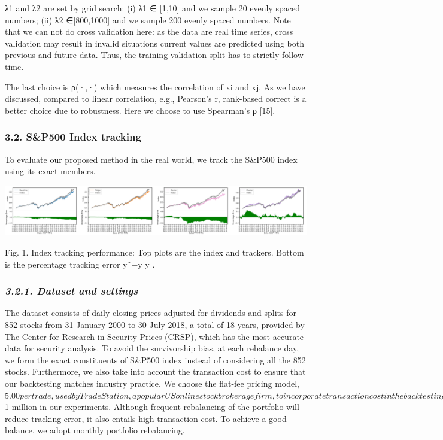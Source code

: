 \documentclass{article}
\begin{document}
λ1 and λ2 are set by grid search: (i) λ1 ∈ [1,10] and we sample 20 evenly spaced numbers; (ii) λ2 ∈[800,1000] and we sample 200 evenly spaced numbers. Note that we can not do cross validation here: as the data are real time series, cross validation may result in invalid situations current values are predicted using both previous and future data. Thus, the training-validation split has to strictly follow time.

The last choice is ρ(·,·) which measures the correlation of xi and xj. As we have discussed, compared to linear correlation, e.g., Pearson's r, rank-based correct is a better choice due to robustness. Here we choose to use Spearman's ρ [15].

\subsubsection{3.2. S\&P500 Index tracking}

To evaluate our proposed method in the real world, we track the S\&P500 index using its exact members.


\includegraphics{_page_3_Figure_0.png}


Fig. 1. Index tracking performance: Top plots are the index and trackers. Bottom is the percentage tracking error yˆ−y y .

\subsubsection{\textit{3.2.1. Dataset and settings}}

The dataset consists of daily closing prices adjusted for dividends and splits for 852 stocks from 31 January 2000 to 30 July 2018, a total of 18 years, provided by The Center for Research in Security Prices (CRSP), which has the most accurate data for security analysis. To avoid the survivorship bias, at each rebalance day, we form the exact constituents of S\&P500 index instead of considering all the 852 stocks. Furthermore, we also take into account the transaction cost to ensure that our backtesting matches industry practice. We choose the flat-fee pricing model, $5.00 per trade, used by TradeStation, a popular US online stock brokerage firm, to incorporate transaction cost in the backtesting. As the transaction cost is applied on each trade separately, the sparse portfolio will incur less cost compared with the portfolio of a large number of stocks. To enforce the sparsity, we only consider the stocks with weights larger than 10−6 [21]. As the transaction cost is related to budget, we assume the initial capital is $1 million in our experiments. Although frequent rebalancing of the portfolio will reduce tracking error, it also entails high transaction cost. To achieve a good balance, we adopt monthly portfolio rebalancing.
\end{document}
